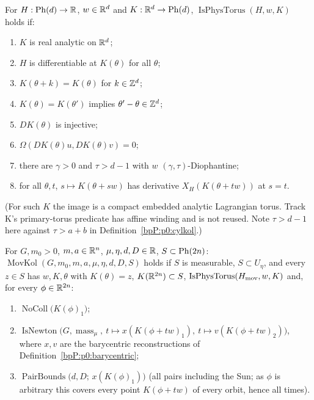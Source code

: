 \begin{definition}\label{bpP:p0:phystorus}
For $H:\mathrm{Ph}(d)\to\mathbb{R}$, $w\in\mathbb{R}^d$ and $K:\mathbb{R}^d\to\mathrm{Ph}(d)$, $\operatorname{IsPhysTorus}(H,w,K)$ holds if:
\begin{enumerate}[label=(\roman*)]
\item $K$ is real analytic on $\mathbb{R}^d$;
\item $H$ is differentiable at $K(\theta)$ for all $\theta$;
\item $K(\theta+k)=K(\theta)$ for $k\in\mathbb{Z}^d$;
\item $K(\theta)=K(\theta')$ implies $\theta'-\theta\in\mathbb{Z}^d$;
\item $DK(\theta)$ is injective;
\item $\Omega(DK(\theta)u,DK(\theta)v)=0$;
\item there are $\gamma>0$ and $\tau>d-1$ with $w$ $(\gamma,\tau)$-Diophantine;
\item for all $\theta,t$, $s\mapsto K(\theta+sw)$ has derivative $X_H(K(\theta+tw))$ at $s=t$.
\end{enumerate}
(For such $K$ the image is a compact embedded analytic Lagrangian torus. Track K's primary-torus predicate has affine
winding and is not reused. Note $\tau>d-1$ here against $\tau>a+b$ in Definition~\ref{bpP:p0:cylkol}.)
\end{definition}

\begin{definition}\label{bpP:p0:movkol}
For $G,m_0>0$, $m,a\in\mathbb{R}^n$, $\mu,\eta,d,D\in\mathbb{R}$, $S\subset\mathrm{Ph}(2n)$: $\operatorname{MovKol}(G,m_0,m,a,\mu,\eta,d,D,S)$ holds if $S$ is
measurable, $S\subset U_\eta$, and every $z\in S$ has $w,K,\theta$ with $K(\theta)=z$, $K(\mathbb{R}^{2n})\subset S$,
$\operatorname{IsPhysTorus}(H_{\rm mov},w,K)$ and, for every $\phi\in\mathbb{R}^{2n}$:
\begin{enumerate}[label=(\alph*)]
\item $\operatorname{NoColl}\bigl(K(\phi)_1\bigr)$;
\item $\operatorname{IsNewton}\bigl(G,\operatorname{mass}_\mu,\ t\mapsto x(K(\phi+tw)_1),\ t\mapsto v(K(\phi+tw)_2)\bigr)$, where $x,v$ are the
  barycentric reconstructions of Definition~\ref{bpP:p0:barycentric};
\item $\operatorname{PairBounds}\bigl(d,D;\,x(K(\phi)_1)\bigr)$ (all pairs including the Sun; as $\phi$ is arbitrary this covers every point $K(\phi+tw)$ of every orbit, hence all times).
\end{enumerate}
\end{definition}

